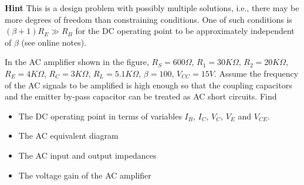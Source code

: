 {\bf Hint} This is a design problem with possibly multiple solutions, 
i.e., there may be more degrees of freedom than constraining conditions. 
One of such conditions is $(\beta+1)R_E \gg R_B$ for the DC operating 
point to be approximately independent of $\beta$ (see online notes). 


% 

\item In the AC amplifier shown in the figure, $R_S=600\Omega$, $R_1=30K\Omega$, 
$R_2=20K\Omega$, $R_E=4K\Omega$, $R_C=3K\Omega$, $R_L=5.1K\Omega$, 
$\beta=100$, $V_{CC}=15V$. 
Assume the 
frequency of the AC signals to be amplified is high enough so that the
coupling capacitors and the emitter by-pass capacitor can be treated as 
AC short circuits. Find
\begin{itemize}
\item The DC operating point in terms of variables $I_B$, $I_C$, $V_C$, $V_E$ 
  and $V_{CE}$.
\item The AC equivalent diagram
\item The AC input and output impedances
\item The voltage gain of the AC amplifier
\end{itemize}

